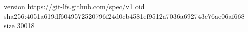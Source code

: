 version https://git-lfs.github.com/spec/v1
oid sha256:4051a619df6049572520796f24d0cb4581ef9512a7036a692743c76ae06af668
size 30018
